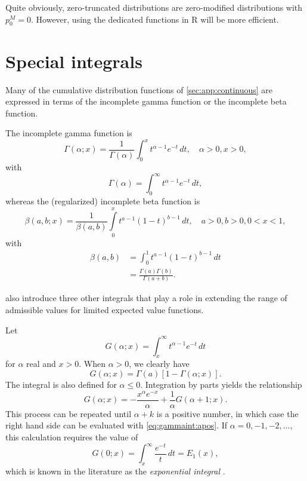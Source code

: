 \documentclass[x11names]{article}
\newcommand{\proglang}[1]{\textsf{#1}}
\begin{document}
Quite obviously, zero-truncated distributions are zero-modified
distributions with $p_0^M = 0$. However, using the dedicated functions
in \proglang{R} will be more efficient.


\section{Special integrals}
\label{sec:special-integrals}

Many of the cumulative distribution functions of
\autoref{sec:app:continuous} are expressed in terms of the incomplete
gamma function or the incomplete beta function.

The incomplete gamma function is
\begin{equation}
  \label{eq:pgamma}
  \Gamma(\alpha; x) = \frac{1}{\Gamma(\alpha)}
  \int_0^x t^{\alpha - 1} e^{-t}\, dt, \quad \alpha > 0, x > 0,
\end{equation}
with
\begin{equation*}
  \Gamma(\alpha) = \int_0^\infty t^{\alpha - 1} e^{-t}\, dt,
\end{equation*}
whereas the (regularized) incomplete beta function is
\begin{equation}
  \label{eq:pbeta}
  \beta(a, b; x) = \frac{1}{\beta(a, b)}
  \int\limits_0^x t^{a - 1} (1 - t)^{b - 1}\, dt, \quad a > 0, b > 0, 0 < x < 1,
\end{equation}
with
\begin{align*}
  \beta(a, b)
  &= \int_0^1 t^{a - 1} (1 - t)^{b - 1}\, dt \\
  &= \frac{\Gamma(a) \Gamma(b)}{\Gamma(a + b)}.
\end{align*}

\citet{LossModels4e} also introduce three other integrals that play a
role in extending the range of admissible values for limited expected
value functions.

Let
\begin{equation}
  \label{eq:gammaint}
  G(\alpha; x) = \int_x^\infty t^{\alpha - 1} e^{-t}\, dt
\end{equation}
for $\alpha$ real and $x > 0$. When $\alpha > 0$, we clearly have
\begin{equation}
  \label{eq:gammaint:apos}
  G(\alpha; x) = \Gamma(a) [1 - \Gamma(\alpha; x)].
\end{equation}
The integral is also defined for $\alpha \le 0$. Integration by parts
yields the relationship
\begin{equation*}
  G(\alpha; x) = -\frac{x^\alpha e^{-x}}{\alpha}
  + \frac{1}{\alpha} G(\alpha + 1; x).
\end{equation*}
This process can be repeated until $\alpha + k$ is a positive number,
in which case the right hand side can be evaluated with
\eqref{eq:gammaint:apos}. If $\alpha = 0, -1, -2, \dots$, this
calculation requires the value of
\begin{equation*}
  \label{eq:expint}
  G(0; x) = \int_x^\infty \frac{e^{-t}}{t}\, dt = E_1(x),
\end{equation*}
which is known in the literature as the \emph{exponential integral}
\citep{Abramowitz:1972}.
\end{document}
